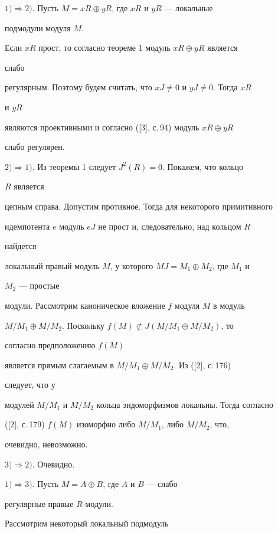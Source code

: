 $1)\Rightarrow 2)$. Пусть $M=xR\oplus yR$, где $xR$ и $yR$ --- локальные 


подмодули модуля $M$. 


Если $xR$ прост, то согласно теореме 1 модуль $xR\oplus yR$ является 


слабо 


регулярным. Поэтому будем считать, что $xJ\ne0$ и $yJ\ne0$. Тогда $xR$ 


и $yR$ 


являются проективными и согласно ([3], с.\,94) модуль $xR\oplus yR$ 


слабо регулярен. 


 


$2)\Rightarrow 1)$. Из теоремы 1 следует $J^2(R)=0$. Покажем, что кольцо 


$R$ является 


цепным справа. Допустим противное. Тогда для некоторого примитивного 


идемпотента $e$ модуль $eJ$ не прост и, следовательно, над кольцом $R$ 


найдется 


локальный правый модуль $M$, у которого $MJ=M_1\oplus M_2$, где $M_1$ и 


$M_2$ --- простые 


модули. Рассмотрим каноническое вложение $f$ модуля $M$ в модуль 


$M/M_1\oplus M/M_2$. Поскольку $f(M)\not\subset J(M/M_1\oplus M/M_2)$, то 


согласно предположению $f(M)$ 


является прямым слагаемым в $M/M_1\oplus M/M_2$. Из ([2], с.\,176) 


следует, что у 


модулей $M/M_1$ и $M/M_2$ кольца эндоморфизмов локальны. Тогда согласно 


([2], с.\,179) $f(M)$ изоморфно либо $M/M_1$, либо $M/M_2$, что, 


очевидно, невозможно. 


 


$3)\Rightarrow 2)$. Очевидно. 


 


$1)\Rightarrow 3)$. Пусть $M=A\oplus B$, где $A$ и $B$ --- слабо 


регулярные правые $R$-модули. 


Рассмотрим некоторый локальный подмодуль


